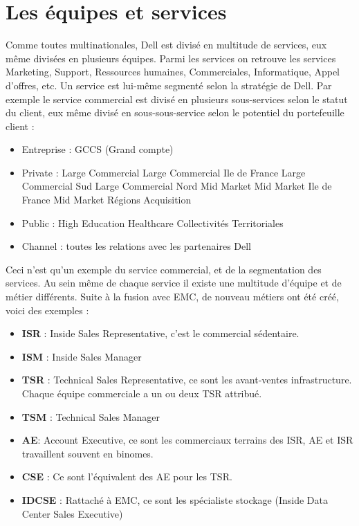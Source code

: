 \documentclass{bredele} %
\begin{document}
    \section{Les équipes et services}
        Comme toutes multinationales, Dell est divisé en multitude de services, eux même divisées en plusieurs équipes. Parmi les services on retrouve les services Marketing, Support, Ressources humaines, Commerciales, Informatique, Appel d’offres, etc.
    \newline
    Un service est lui-même segmenté selon la stratégie de Dell. Par exemple le service commercial est divisé en plusieurs sous-services selon le statut du client, eux même divisé en sous-sous-service selon le potentiel du portefeuille client :
        \begin{itemize}
            \item Entreprise : GCCS (Grand compte)
            \item Private :
                \subitem Large Commercial
                    \subsubitem Large Commercial Ile de France
                    \subsubitem Large Commercial Sud
                    \subsubitem Large Commercial Nord
                \subitem Mid Market
                    \subsubitem Mid Market Ile de France
                    \subsubitem Mid Market Régions
                \subitem Acquisition
            \item Public :
                \subitem High Education
                \subitem Healthcare
                \subitem Collectivités Territoriales
            \item Channel : toutes les relations avec les partenaires Dell
        \end{itemize}
    Ceci n’est qu’un exemple du service commercial, et de la segmentation des services. Au sein même de chaque service il existe une multitude d’équipe et de métier différents. Suite à la fusion avec EMC, de nouveau métiers ont été créé, voici des exemples :
        \begin{itemize}
            \item \textbf{ISR} : Inside Sales Representative, c’est le commercial sédentaire.
            \item \textbf{ISM} : Inside Sales Manager
            \item \textbf{TSR} : Technical Sales Representative, ce sont les avant-ventes infrastructure. Chaque équipe commerciale a un ou deux TSR attribué.
            \item \textbf{TSM} : Technical Sales Manager
            \item \textbf{AE}: Account Executive, ce sont les commerciaux terrains des ISR, AE et ISR travaillent souvent en binomes.
            \item \textbf{CSE} : Ce sont l’équivalent des AE pour les TSR.
            \item \textbf{IDCSE} : Rattaché à EMC, ce sont les spécialiste stockage (Inside Data Center Sales Executive)
        \end{itemize}
\end{document}
